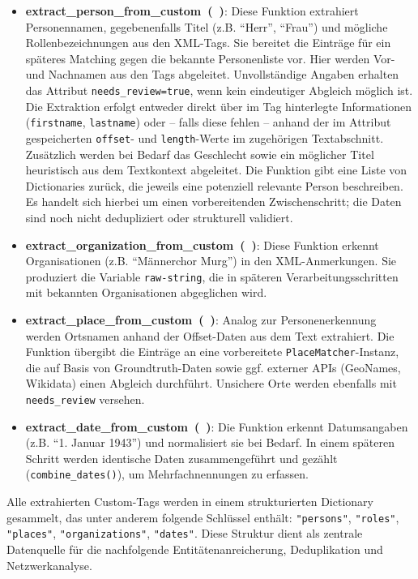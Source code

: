 \documentclass[12pt, a4paper, ngerman, bidi=default]{article}
\newcommand{\code}[1]{\colorbox{VeryLightGray}{\texttt{#1}}} %
\begin{document}
\begin{itemize}
    \item \textbf{extract\_person\_from\_custom~(~)}: Diese Funktion extrahiert Personennamen, gegebenenfalls Titel (z.B. \enquote{Herr}, \enquote{Frau}) und mögliche Rollenbezeichnungen aus den XML-Tags. Sie bereitet die Einträge für ein späteres Matching gegen die bekannte Personenliste vor. Hier werden Vor- und Nachnamen aus den Tags abgeleitet. Unvollständige Angaben erhalten das Attribut \code{needs\_review=true}, wenn kein eindeutiger Abgleich möglich ist. Die Extraktion erfolgt entweder direkt über im Tag hinterlegte Informationen (\code{firstname}, \code{lastname}) oder – falls diese fehlen – anhand der im Attribut gespeicherten \code{offset}- und \code{length}-Werte im zugehörigen Textabschnitt. Zusätzlich werden bei Bedarf das Geschlecht sowie ein möglicher Titel heuristisch aus dem Textkontext abgeleitet. Die Funktion gibt eine Liste von Dictionaries zurück, die jeweils eine potenziell relevante Person beschreiben. Es handelt sich hierbei um einen vorbereitenden Zwischenschritt; die Daten sind noch nicht dedupliziert oder strukturell validiert.
  
  \item \textbf{extract\_organization\_from\_custom~(~)}: Diese Funktion erkennt Organisationen (z.B. \enquote{Männerchor Murg}) in den XML-Anmerkungen. Sie produziert die Variable \code{raw-string}, die in späteren Verarbeitungsschritten mit bekannten Organisationen abgeglichen wird. 

  \item \textbf{extract\_place\_from\_custom~(~)}: Analog zur Personenerkennung werden Ortsnamen anhand der Offset-Daten aus dem Text extrahiert. Die Funktion übergibt die Einträge an eine vorbereitete \code{PlaceMatcher}-Instanz, die auf Basis von Groundtruth-Daten sowie ggf. externer APIs (GeoNames, Wikidata) einen Abgleich durchführt. Unsichere Orte werden ebenfalls mit \code{needs\_review} versehen.
  
  \item \textbf{extract\_date\_from\_custom~(~)}: Die Funktion erkennt Datumsangaben (z.B. \enquote{1. Januar 1943}) und normalisiert sie bei Bedarf. In einem späteren Schritt werden identische Daten zusammengeführt und gezählt (\code{combine\_dates()}), um Mehrfachnennungen zu erfassen.
\end{itemize}

Alle extrahierten Custom-Tags werden in einem strukturierten Dictionary gesammelt, das unter anderem folgende Schlüssel enthält: \code{"persons"}, \code{"roles"}, \code{"places"}, \code{"organizations"}, \code{"dates"}. Diese Struktur dient als zentrale Datenquelle für die nachfolgende Entitätenanreicherung, Deduplikation und Netzwerkanalyse.
\end{document}
